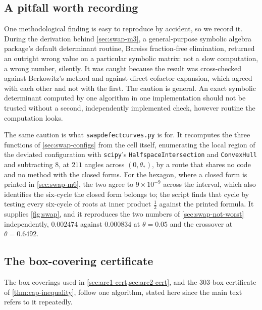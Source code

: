 \documentclass[11pt,reqno]{amsart}
\renewcommand{\_}{\origunderscore\allowbreak}
\numberwithin{equation}{section}
\theoremstyle{plain}
\theoremstyle{definition}
\theoremstyle{remark}
\begin{document}
\subsection*{A pitfall worth recording}

One methodological finding is easy to reproduce by accident, so we
record it. During the derivation behind \cref{sec:swap-m3}, a
general-purpose symbolic algebra package's default determinant routine,
Bareiss fraction-free elimination, returned an outright wrong value on a
particular symbolic matrix: not a slow computation, a wrong number,
silently. It was caught because the result was cross-checked against
Berkowitz's method and against direct cofactor expansion, which agreed
with each other and not with the first. The caution is general. An exact
symbolic determinant computed by one algorithm in one implementation
should not be trusted without a second, independently implemented check,
however routine the computation looks.

The same caution is what \texttt{swap\_defect\_curves.py} is for. It
recomputes the three functions of \cref{sec:swap-configs} from the cell
itself, enumerating the local region of the deviated configuration with
\texttt{scipy}'s \texttt{HalfspaceIntersection} and \texttt{ConvexHull}
and subtracting $8$, at $211$ angles across $(0,\theta_*)$, by a route
that shares no code and no method with the closed forms. For the
hexagon, where a closed form is printed in \cref{sec:swap-m6}, the two
agree to $9\times10^{-9}$ across the interval, which also identifies the
six-cycle the closed form belongs to; the script finds that cycle by
testing every six-cycle of roots at inner product $\tfrac12$ against the
printed formula. It supplies \cref{fig:swap},
and it reproduces the two numbers of \cref{sec:swap-not-worst}
independently, $0.002474$ against $0.000834$ at $\theta=0.05$ and the
crossover at $\theta=0.6492$.

\subsection*{The box-covering certificate}\label{app:box-cover-algo}

The box coverings used in \cref{sec:arc1-cert,sec:arc2-cert}, and the
$303$-box certificate of \cref{thm:cap-inequality}, follow one
algorithm, stated here since the main text refers to it repeatedly.
\end{document}
